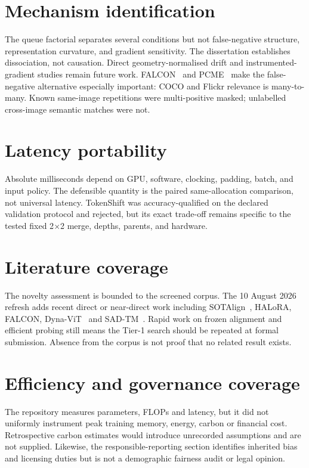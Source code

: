 \section{Mechanism identification}
The queue factorial separates several conditions but not false-negative structure, representation curvature, and gradient sensitivity. The dissertation establishes dissociation, not causation. Direct geometry-normalised drift and instrumented-gradient studies remain future work. FALCON~\cite{kim2026falcon} and PCME~\cite{chun2021pcme} make the false-negative alternative especially important: COCO and Flickr relevance is many-to-many. Known same-image repetitions were multi-positive masked; unlabelled cross-image semantic matches were not.

\section{Latency portability}
Absolute milliseconds depend on GPU, software, clocking, padding, batch, and input policy. The defensible quantity is the paired same-allocation comparison, not universal latency. TokenShift was accuracy-qualified on the declared validation protocol and rejected, but its exact trade-off remains specific to the tested fixed 2$\times$2 merge, depths, parents, and hardware.

\section{Literature coverage}
The novelty assessment is bounded to the screened corpus. The 10 August 2026 refresh adds recent direct or near-direct work including SOTAlign~\cite{roschmann2026sotalign}, HALoRA, FALCON, Dyna-ViT~\cite{rubab2026dynavit} and SAD-TM~\cite{xie2026sadtm}. Rapid work on frozen alignment and efficient probing still means the Tier-1 search should be repeated at formal submission. Absence from the corpus is not proof that no related result exists.

\section{Efficiency and governance coverage}
The repository measures parameters, FLOPs and latency, but it did not uniformly instrument peak training memory, energy, carbon or financial cost. Retrospective carbon estimates would introduce unrecorded assumptions and are not supplied. Likewise, the responsible-reporting section identifies inherited bias and licensing duties but is not a demographic fairness audit or legal opinion.

